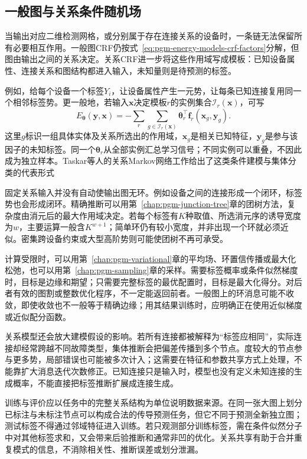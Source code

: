 \subsection{一般图与关系条件随机场}
\label{sec:pgm-energy-models-general-relational}

当输出对应二维检测网格，或分别属于存在连接关系的设备时，一条链无法保留所有必要相互作用。一般图CRF仍按式~\eqref{eq:pgm-energy-models-crf-factors}分解，但图由输出之间的关系决定。关系CRF进一步将这些作用域写成模板：已知设备属性、连接关系和图结构都进入输入，未知量则是待预测的标签。

例如，给每个设备一个标签$Y_i$，让设备属性产生一元势，让每条已知连接复用同一个相邻标签势。更一般地，若输入$\bm{x}$决定模板$r$的实例集合$\mathcal{I}_r(\bm{x})$，可写
\begin{equation}
  E_{\bm{\theta}}(\bm{y},\bm{x})
   =-\sum_r\sum_{g\in\mathcal{I}_r(\bm{x})}
        \bm{\theta}_r^\top
             \bm{f}_r(\bm{x}_g,\bm{y}_g).
  \label{eq:pgm-energy-models-relational-crf}
\end{equation}
这里$g$标识一组具体实体及关系所选出的作用域，$\bm{x}_g$是相关已知特征，$\bm{y}_g$是参与该因子的未知标签。同一个$\bm{\theta}_r$从全部实例汇总学习信号；不同实例可以重叠，不因此成为独立样本。Taskar等人的关系Markov网络工作给出了这类条件建模与集体分类的代表形式

固定关系输入并没有自动使输出图无环。例如设备之间的连接形成一个闭环，标签势也会形成闭环。精确推断可以用第~\ref{chap:pgm-junction-tree}章的团树方法，复杂度由消元后的最大作用域决定。若每个标签有$K$种取值、所选消元序的诱导宽度为$w$，主要运算一般含$K^{w+1}$；简单环仍有较小宽度，并非出现一个环就必须近似。密集跨设备约束或大型高阶势则可能使团树不再可承受。

计算受限时，可以用第~\ref{chap:pgm-variational}章的平均场、环置信传播或最大化松弛，也可以用第~\ref{chap:pgm-sampling}章的采样。需要标签概率或条件似然梯度时，目标是边缘和期望；只需要完整标签的最优配置时，目标是最大化得分。对后者有效的图割或整数优化程序，不一定能返回前者。一般图上的环消息可能不收敛，即使收敛也不一般等于精确边缘；用其结果训练时，应明确正在使用近似梯度或近似配分函数。

关系模型还会放大建模假设的影响。若所有连接都被解释为“标签应相同”，实际连接却经常跨越不同故障类型，集体推断会把偏差传播到多个节点。度较大的节点参与更多势，局部错误也可能被多次计入；这需要在特征和参数共享方式上处理，不能靠扩大消息迭代次数修正。已知连接只是输入时，模型也没有定义未知连接的生成概率，不能直接把标签推断扩展成连接生成。

训练与评价应以任务中的完整关系结构为单位说明数据来源。在同一张大图上划分已标注与未标注节点可以构成合法的传导预测任务，但它不同于预测全新独立图；测试标签不得通过邻域特征进入训练。若只观测部分训练标签，需在条件似然分子中对其他标签求和，又会带来后验推断和通常非凹的优化。关系共享有助于合并重复模式的信息，不消除相关性、推断误差或划分泄漏。

